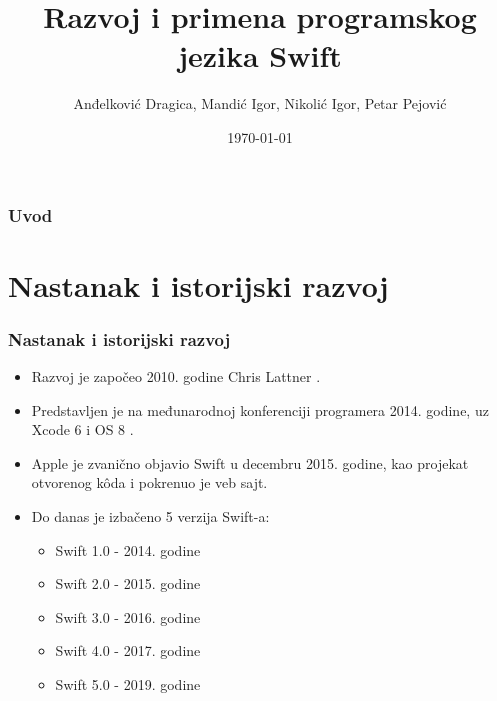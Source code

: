 \documentclass{beamer}
\title[Swift]{Razvoj i primena programskog jezika Swift} %
\author[AD, PP, IM, IN]{Anđelković Dragica, Mandić Igor, Nikolić Igor, Petar Pejović} %
\institute[Matf] %
{
Matematički fakultet \\ %
\medskip
\textit{andjelkovic.dragica96@gmail.com, igormandic996@gmail.com, \\ igor.nikolic032@hotmail.com, petar.pejovic8@gmail.com} %
}
\date{\today} %
\begin{document}
\begin{frame}
\titlepage %
\end{frame}

\begin{frame}
\frametitle{Uvod} %
\tableofcontents %





\end{frame}
\section{Nastanak i istorijski razvoj}
\begin{frame}
\frametitle{Nastanak i istorijski razvoj}
\begin{itemize}
\item  Razvoj je započeo 2010. godine Chris Lattner \cite{mastering_swift3}.
\item  Predstavljen je na međunarodnoj konferenciji programera 2014. godine, uz  Xcode 6 i OS 8 \cite{thenextweb_sajt}.
\item Apple je zvanično objavio Swift u decembru 2015. godine, kao projekat otvorenog k\^{o}da i pokrenuo je veb sajt.
\item Do danas je izbačeno 5 verzija Swift-a:
\begin{itemize}
\item{Swift 1.0} - 2014. godine
\item{Swift 2.0} - 2015. godine
\item{Swift 3.0} - 2016. godine
\item{Swift 4.0} - 2017. godine
\item{Swift 5.0} - 2019. godine
\end{itemize}
\end{itemize}

\end{frame}
\end{document}
